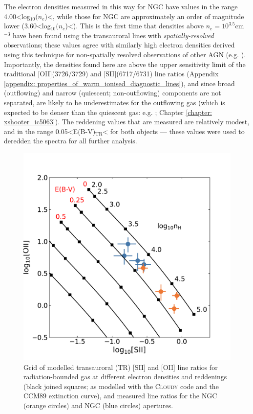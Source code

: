 The electron densities measured in this way for NGC have values in the range \mbox{4.00\;\textless\;log$_{10}(n_e$\;[cm$^{-3}$])\;\textless{}}, while those for NGC are approximately an order of magnitude lower (\mbox{3.60\;\textless\;log$_{10}(n_e$\;[cm$^{-3}$])\;\textless{}}). This is the first time that densities above $n_e=10^{3.5}$\;cm$^{-3}$ have been found using the transauroral lines with \textit{spatially-resolved} observations; these values agree with similarly high electron densities derived using this technique for non-spatially resolved observations of other AGN (e.g. \citealt{Holt2011, Rose2018, Santoro2018, Spence2018, Davies2020, Speranza2022}). Importantly, the densities found here are above the upper sensitivity limit of the traditional [OII](3726/3729) and [SII](6717/6731) line ratios (Appendix \ref{appendix: properties_of_warm_ionised_diagnostic_lines}), and since broad (outflowing) and narrow (quiescent; non-outflowing) components are not separated, are likely to be underestimates for the outflowing gas (which is expected to be denser than the quiescent gas: e.g. \citealt{VillarMartin1999}; Chapter \ref{chapter: xshooter_ic5063}). The reddening values that are measured are relatively modest, and in the range \mbox{0.05\;\textless\;E(B-V)$_\mathrm{TR}$\;\textless{}} for both objects --- these values were used to deredden the spectra for all further analysis.

\begin{figure}[!t]
    \centering
    \includegraphics[width=0.8\linewidth]{figures/stis_seyferts/tr_ddd_seyferts.pdf}
    \caption[Transauroral {[}OII{]} and {[}SII{]} line ratio diagram for NGC and NGC, showing both measured values and those predicted from photoionisation modelling.]{Grid of modelled transauroral (TR) [SII] and [OII] line ratios for radiation-bounded gas at different electron densities and reddenings (black joined squares; as modelled with the \textsc{Cloudy} code and the CCM89 extinction curve), and measured line ratios for the NGC (orange circles) and NGC (blue circles) apertures.}
    \label{fig: stis_seyferts: tr_ddd}
\end{figure}

